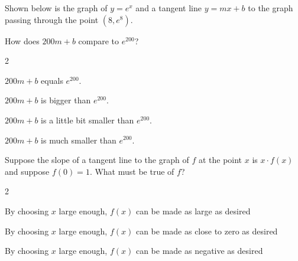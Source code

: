 \documentclass[12pt]{ximera}
\renewenvironment{multipleChoice}
{\begin{trivlist}\item[\hskip\labelsep\small\bfseries Choose the best answer:]
\hfil\begin{enumerate}\begin{multicols}{2}}
 {\end{multicols}\end{enumerate}\end{trivlist}}
\renewcommand{\choice}[2][]{\item \begin{minipage}[t]{2in}#2\end{minipage}\ifthenelse{\boolean{#1}}{\ifhandout \else  \fi}{}}
\begin{document}
\begin{minipage}{\textwidth}
\begin{problem}

  Shown below is the graph of $y = e^x$ and a tangent line $y = mx + b$ to the graph passing through the point $(8,e^8)$.
  \begin{image}
  \end{image}
  How does $200m + b$ compare to $e^{200}$?
  \begin{multipleChoice}
    \choice{$200m + b$ equals $e^{200}$.}
    \choice{$200m + b$ is bigger than $e^{200}$.}
    \choice{$200m + b$ is a little bit smaller than $e^{200}$.}
    \choice[correct]{$200m + b$ is much smaller than $e^{200}$.}
  \end{multipleChoice}
\end{problem}
\end{minipage}

\vspace{6ex}

\begin{minipage}{\textwidth}
\begin{problem}
  Suppose the slope of a tangent line to the graph of $f$ at the point $x$ is $x \cdot f(x)$ and suppose $f(0) = 1$.  What must be true of $f$?
  \begin{multipleChoice}
    \choice[correct]{By choosing $x$ large enough, $f(x)$ can be made as large as desired}
    \choice{By choosing $x$ large enough, $f(x)$ can be made as close to zero as desired}
    \choice{By choosing $x$ large enough, $f(x)$ can be made as negative as desired}
  \end{multipleChoice}
\end{problem}
\end{minipage}
\end{document}
